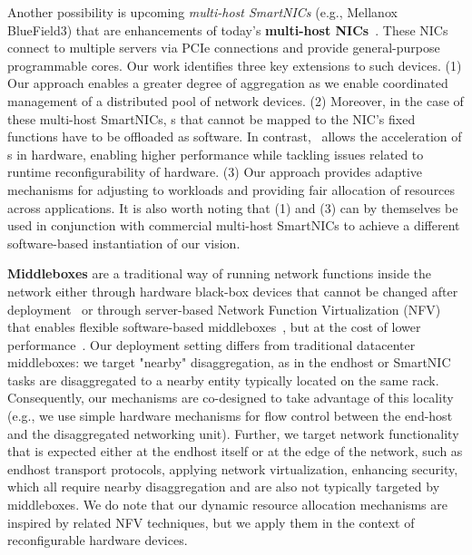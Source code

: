 Another possibility is upcoming \emph{multi-host SmartNICs} (e.g., Mellanox BlueField3) that are enhancements of today's \textbf{multi-host NICs}~\cite{ocp-nic,Intel-RedRockCanyon}. These NICs connect to multiple servers via PCIe connections and provide general-purpose programmable cores. Our work identifies three key extensions to such devices. (1) Our approach enables a greater degree of aggregation as we enable coordinated management of a distributed pool of network devices. (2) Moreover, in the case of these multi-host SmartNICs, \nt{}s that cannot be mapped to the NIC's fixed functions have to be offloaded as software. In contrast, \snic\ allows the acceleration of \nt{}s in hardware, enabling higher performance while tackling issues related to runtime reconfigurability of hardware. (3) Our approach provides adaptive mechanisms for adjusting to workloads and providing fair allocation of resources across applications. It is also worth noting that (1) and (3) can by themselves be used in conjunction with commercial multi-host SmartNICs to achieve a different software-based instantiation of our vision.

\textbf{Middleboxes} are a traditional way of running network functions inside the network either through hardware black-box devices that cannot be changed after deployment~\cite{aplomb-sigcomm20,comb-nsdi12,walfish-osdi04} or through server-based Network Function Virtualization (NFV) that enables flexible software-based middleboxes~\cite{clickos-nsdi14,e2-sosp15,metron-nsdi18,NFP-sigcomm17,parabox-sosr17}, but at the cost of lower performance~\cite{netbricks,netvm-nsdi14}.  Our deployment setting differs from traditional datacenter middleboxes: we target "nearby" disaggregation, as in the endhost or SmartNIC tasks are disaggregated to a nearby entity typically located on the same rack. Consequently, our mechanisms are co-designed to take advantage of this locality (e.g., we use simple hardware mechanisms for flow control between the end-host and the disaggregated networking unit). Further, we target network functionality that is expected either at the endhost itself or at the edge of the network, such as endhost transport protocols, applying network virtualization, enhancing security, which all require nearby disaggregation and are also not typically targeted by middleboxes. We do note that our dynamic resource allocation mechanisms are inspired by related NFV techniques, but we apply them in the context of reconfigurable hardware devices.


